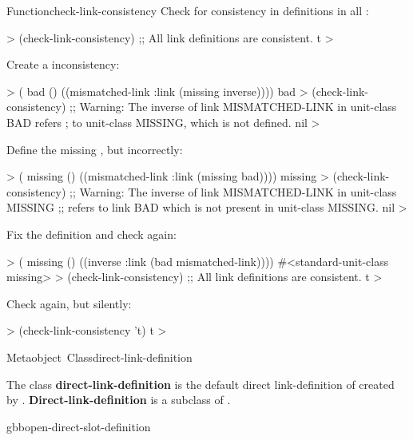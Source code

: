 \documentclass[10pt,twoside,english,pdftex]{article}
\begin{document}
\begin{functiondoc}{Function}{check-link-consistency}{
    \returns{} }
\fnexamples
Check for consistency in  definitions in all
: 
%
\W\supp
\begin{example}
  > (check-link-consistency)
  ;; All link definitions are consistent.
  t
  >
\end{example}
%
%
%
Create a  inconsistency:
%
\W\supp\notpretop
\begin{example}
  > ( bad () 
       ((mismatched-link :link (missing inverse))))
  bad
  > (check-link-consistency)
  ;; Warning: The inverse of link MISMATCHED-LINK in unit-class BAD refers
  ;           to unit-class MISSING, which is not defined.
  nil
  >
\end{example}
%
Define the missing , but incorrectly:
%
\W\supp\notpretop
\begin{example}
  > ( missing () ((mismatched-link :link (missing bad))))
  missing
  > (check-link-consistency)
  ;; Warning: The inverse of link MISMATCHED-LINK in unit-class MISSING
  ;;          refers to link BAD which is not present in unit-class MISSING.
  nil
  >
\end{example}
%
Fix the definition and check again:
%
\W\supp\notpretop
\begin{example}
  > ( missing () ((inverse :link (bad mismatched-link))))
  #<standard-unit-class missing>
  > (check-link-consistency)
  ;; All link definitions are consistent.
  t
  >
\end{example}
%
Check again, but silently:
%
\W\supp\notpretop
\begin{example}
  > (check-link-consistency 't)
  t
  > 
\end{example}

\end{functiondoc}


\begin{functiondoc}{Metaobject~Class}{direct-link-definition}{}
%

\fnsyntax

\fnpackage {}

\fnmodule {}

\fndescription The class \textbf{direct-link-definition} is the default
direct link-definition  of 
created by \textbf{}.
\textbf{Direct-link-definition} is a subclass of
\textbf{}.

\begin{alsos}{gbbopen-direct-slot-definition}
\end{alsos}

\end{functiondoc}
\end{document}
